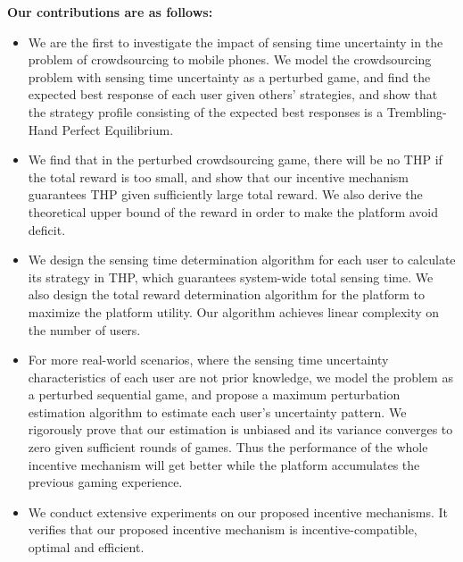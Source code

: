\documentclass{IEEEtran}
\begin{document}
\noindent \textbf{Our contributions are as follows:}
\begin{itemize}
\item We are the first to investigate the impact of sensing {\color{black}time} uncertainty in the problem of crowdsourcing to mobile phones. We model the crowdsourcing problem with sensing {\color{black}time} uncertainty as a perturbed game, and find the expected best response of each user given others' strategies, and show that the strategy profile consisting of the expected best responses is a Trembling-Hand Perfect Equilibrium.
\item We find that in the perturbed crowdsourcing game, there will be no THP if the total reward is too small, and show that our incentive mechanism guarantees THP given sufficiently large total reward. We also derive the theoretical upper bound of the reward in order to make the platform avoid deficit.
\item We design the sensing time determination algorithm for each user to calculate its strategy in THP, which guarantees system-wide total sensing time. %
We also design the total reward determination algorithm for the platform to maximize the platform utility. Our algorithm achieves linear complexity on the number of users.
\item For more real-world scenarios, where the sensing {\color{black}time} uncertainty characteristics of each user are not prior knowledge, we model the problem as a perturbed sequential game, and propose a maximum perturbation estimation algorithm to estimate each user's uncertainty pattern. We rigorously prove that our estimation is unbiased and its variance converges to zero given sufficient rounds of games. Thus the performance of the whole incentive mechanism will get better while the platform accumulates the previous gaming experience.
\item We conduct extensive experiments on our proposed incentive mechanisms. It verifies that our proposed incentive mechanism is incentive-compatible, optimal and efficient.
\end{itemize}
\end{document}
